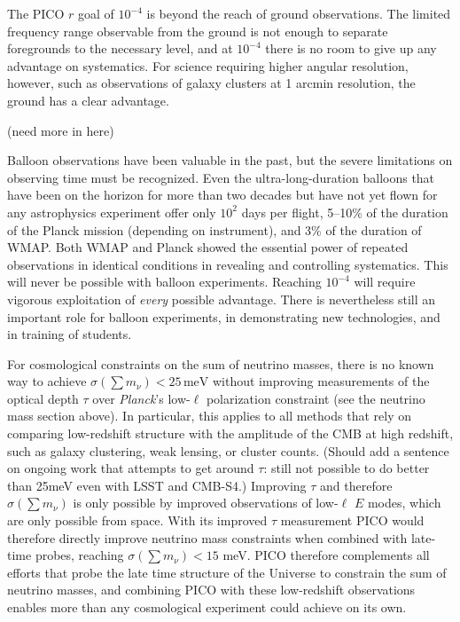 \documentclass[PICOReport.tex]{subfiles}
\begin{document}
The PICO $r$ goal of $10^{-4}$ is beyond the reach of ground observations.  The limited frequency range observable from the ground is not enough to separate foregrounds to the necessary level, and at $10^{-4}$ there is no room to give up any advantage on systematics.  For science requiring higher angular resolution, however, such as observations of galaxy clusters at 1 arcmin resolution, the ground has a clear advantage.

(need more in here)

Balloon observations have been valuable in the past, but the severe limitations on observing time must be recognized.  Even the ultra-long-duration balloons that have been on the horizon for more than two decades but have not yet flown for any astrophysics experiment offer only $10^2$ days per flight, 5--10\% of the duration of the Planck mission (depending on instrument), and 3\% of the duration of WMAP.  Both WMAP and Planck showed the essential power of repeated observations in identical conditions in revealing and controlling systematics.  This will never be possible with balloon experiments.  Reaching $10^{-4}$ will require vigorous exploitation of {\it every\/} possible advantage.  There is nevertheless still an important role for balloon experiments, in demonstrating new technologies, and in training of students.

For cosmological constraints on the sum of neutrino masses, there is no known way to achieve $\sigma(\sum m_\nu)<25\,\mathrm{meV}$ without improving measurements of the optical depth $\tau$ over {\it Planck}'s low-$\ell$ polarization constraint (see the neutrino mass section above).
In particular, this applies to all methods that rely on comparing low-redshift structure with the amplitude of the CMB at high redshift, such as galaxy clustering, weak lensing, or cluster counts.
(Should add a sentence on ongoing work that attempts to get around $\tau$: still not possible to do better than 25meV even with LSST and CMB-S4.)
Improving $\tau$ and therefore $\sigma(\sum m_\nu)$ is only possible by improved observations of low-$\ell$ $E$ modes, which are only possible from space.
With its improved $\tau$ measurement PICO would therefore directly improve neutrino mass constraints when combined with late-time probes, reaching $\sigma(\sum m_\nu)<15$ meV.  
PICO therefore complements all efforts that probe the late time structure of the Universe to constrain the sum of neutrino masses, and combining PICO with these low-redshift observations enables more than any cosmological experiment could achieve on its own.
 
\end{document}
